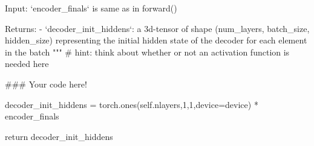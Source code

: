 \begin{python}
       Input: `encoder_finals` is same as in forward()

       Returns: 
         - `decoder_init_hiddens`: a 3d-tensor of shape 
              (num_layers, batch_size, hidden_size) representing the initial
              hidden state of the decoder for each element in the batch 
    """
    # hint: think about whether or not an activation function is needed here

    ### Your code here!
    
    decoder_init_hiddens = torch.ones(self.nlayers,1,1,device=device) * encoder_finals

    return decoder_init_hiddens
\end{python}

